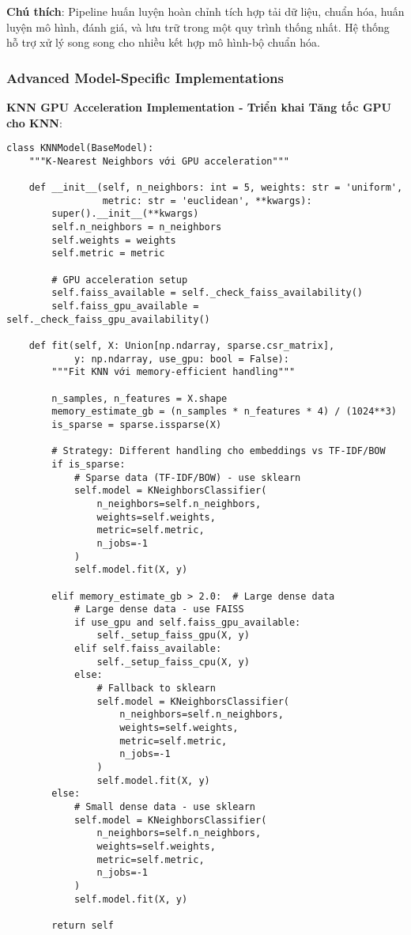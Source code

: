\textbf{Chú thích}: Pipeline huấn luyện hoàn chỉnh tích hợp tải dữ liệu, chuẩn hóa, huấn luyện mô hình, đánh giá, và lưu trữ trong một quy trình thống nhất. Hệ thống hỗ trợ xử lý song song cho nhiều kết hợp mô hình-bộ chuẩn hóa.

\subsubsection{Advanced Model-Specific Implementations}

\textbf{KNN GPU Acceleration Implementation - Triển khai Tăng tốc GPU cho KNN}:

\begin{verbatim}
class KNNModel(BaseModel):
    """K-Nearest Neighbors với GPU acceleration"""
    
    def __init__(self, n_neighbors: int = 5, weights: str = 'uniform', 
                 metric: str = 'euclidean', **kwargs):
        super().__init__(**kwargs)
        self.n_neighbors = n_neighbors
        self.weights = weights
        self.metric = metric
        
        # GPU acceleration setup
        self.faiss_available = self._check_faiss_availability()
        self.faiss_gpu_available = self._check_faiss_gpu_availability()
        
    def fit(self, X: Union[np.ndarray, sparse.csr_matrix], 
            y: np.ndarray, use_gpu: bool = False):
        """Fit KNN với memory-efficient handling"""
        
        n_samples, n_features = X.shape
        memory_estimate_gb = (n_samples * n_features * 4) / (1024**3)
        is_sparse = sparse.issparse(X)
        
        # Strategy: Different handling cho embeddings vs TF-IDF/BOW
        if is_sparse:
            # Sparse data (TF-IDF/BOW) - use sklearn
            self.model = KNeighborsClassifier(
                n_neighbors=self.n_neighbors,
                weights=self.weights,
                metric=self.metric,
                n_jobs=-1
            )
            self.model.fit(X, y)
            
        elif memory_estimate_gb > 2.0:  # Large dense data
            # Large dense data - use FAISS
            if use_gpu and self.faiss_gpu_available:
                self._setup_faiss_gpu(X, y)
            elif self.faiss_available:
                self._setup_faiss_cpu(X, y)
            else:
                # Fallback to sklearn
                self.model = KNeighborsClassifier(
                    n_neighbors=self.n_neighbors,
                    weights=self.weights,
                    metric=self.metric,
                    n_jobs=-1
                )
                self.model.fit(X, y)
        else:
            # Small dense data - use sklearn
            self.model = KNeighborsClassifier(
                n_neighbors=self.n_neighbors,
                weights=self.weights,
                metric=self.metric,
                n_jobs=-1
            )
            self.model.fit(X, y)
            
        return self
\end{verbatim}

